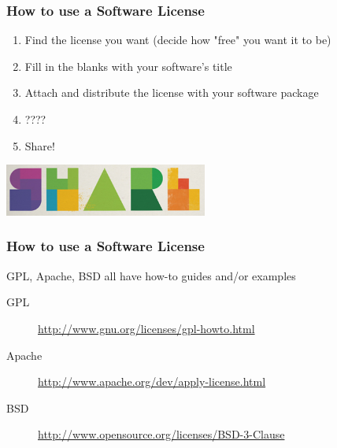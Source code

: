 \documentclass{beamer}
\begin{document}
\begin{frame}
  \frametitle{How to use a Software License}
  \begin{enumerate}
  \item Find the license you want (decide how "free" you want it to be)
  \item Fill in the blanks with your software's title
  \item Attach and distribute the license with your software package
  \item ????
    \pause
  \item Share!
  \end{enumerate}
  \begin{center} 
    \includegraphics[width=0.5\textwidth]{../img/share} 
  \end{center}
\end{frame}

\begin{frame}
  \frametitle{How to use a Software License}
  \begin{Large}
    GPL, Apache, BSD all have how-to guides and/or examples
    \begin{description}
    \item[GPL]
      \href{http://www.gnu.org/licenses/gpl-howto.html}{http://www.gnu.org/licenses/gpl-howto.html}
    \item[Apache]
      \href{http://www.apache.org/dev/apply-license.html}{http://www.apache.org/dev/apply-license.html}
    \item[BSD]
      \href{http://www.opensource.org/licenses/BSD-3-Clause}{http://www.opensource.org/licenses/BSD-3-Clause}
    \end{description}
  \end{Large}

\end{frame}



\end{document}
